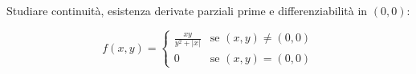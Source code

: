 \documentclass{article}
\begin{document}
Studiare continuità, esistenza derivate parziali prime e differenziabilità in \( (0, 0) \):

\[
f(x, y) = 
\begin{cases} 
\frac{xy}{y^2 + |x|} & \text{se } (x, y) \neq (0, 0) \\ 
0 & \text{se } (x, y) = (0, 0)
\end{cases}
\]
\end{document}
